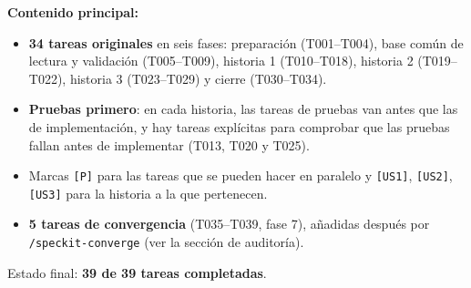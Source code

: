 \documentclass[12pt,a4paper]{article}
\begin{document}
\textbf{Contenido principal:}
\begin{itemize}
  \item \textbf{34 tareas originales} en seis fases: preparación (T001--T004), base común de lectura y validación (T005--T009), historia 1 (T010--T018), historia 2 (T019--T022), historia 3 (T023--T029) y cierre (T030--T034).
  \item \textbf{Pruebas primero}: en cada historia, las tareas de pruebas van antes que las de implementación, y hay tareas explícitas para comprobar que las pruebas fallan antes de implementar (T013, T020 y T025).
  \item Marcas \texttt{[P]} para las tareas que se pueden hacer en paralelo y \texttt{[US1]}, \texttt{[US2]}, \texttt{[US3]} para la historia a la que pertenecen.
  \item \textbf{5 tareas de convergencia} (T035--T039, fase 7), añadidas después por \texttt{/speckit-converge} (ver la sección de auditoría).
\end{itemize}

Estado final: \textbf{39 de 39 tareas completadas}.
\end{document}
